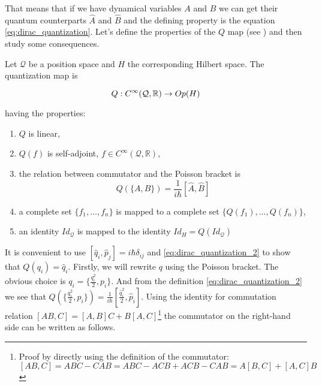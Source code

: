 That means that if we have dynamical variables $A$ and $B$ we can get their quantum counterparts $\hat{A}$ and $\hat{B}$ and the
defining property is the equation \ref{eq:dirac_quantization}. Let's define the properties of the $Q$ map (see \cite{floarin_jung})
and then study some consequences.

\begin{definition}
    \label{df:o_map}

    Let $\mathcal{Q}$ be a position space and $H$ the corresponding Hilbert space. The quantization map is

    \begin{equation}
        Q: C^{\infty}(\mathcal{Q}, \mathbb{R}) \to Op(H) \\
    \end{equation}
    
    having the properties:

    \begin{enumerate}
        \item $Q$ is linear,
        \item $Q(f)$ is self-adjoint, $f \in C^{\infty}(\mathcal{Q}, \mathbb{R})$,
        \item the relation between commutator and the Poisson bracket is
            \begin{equation}
                \label{eq:dirac_quantization_2}
                Q(\{A, B\}) = \frac{1}{i \hbar} [\hat{A}, \hat{B}]
            \end{equation}
        \item a complete set $\{f_{1}, \dots, f_{n}\}$ is mapped to a complete set $\{Q(f_{1}), \dots, Q(f_{n})\}$,
        \item an identity $Id_{\mathcal{Q}}$ is mapped to the identity $Id_{H} = Q(Id_{\mathcal{Q}})$
    \end{enumerate}
\end{definition}

It is convenient to use $[\hat{q}_{i}, \hat{p}_{j}] = i \hbar \delta_{ij}$ and \ref{eq:dirac_quantization_2} to show
that $Q(q_{i}) = \hat{q}_{i}$. Firstly, we will rewrite $q$ using the Poisson bracket. The obvious choice is $q_{i} = \{\frac{q_{i}^{2}}{2}, p_{i}\}$.
And from the definition \ref{eq:dirac_quantization_2} we see that $Q(\{\frac{q_{i}^{2}}{2}, p_{i}\}) = \frac{1}{i \hbar}[\frac{\hat{q}_{i}^{2}}{2}, \hat{p}_{i}]$.
Using the identity for commutation relation $[AB, C] = [A, B]C + B[A, C]$\footnote{Proof by directly using the definition of 
the commutator: $[AB, C] = ABC - CAB = ABC - ACB + ACB - CAB = A [B, C] + [A, C] B$} the commutator on the right-hand side can
be written as follows.

